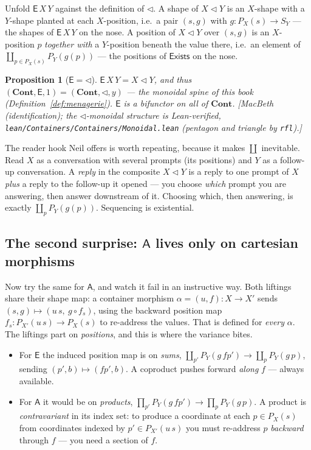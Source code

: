 \documentclass[11pt,a4paper]{book}
\newcommand{\Cont}{\mathbf{Cont}}
\theoremstyle{plain}
\newtheorem{Proposition}[Theorem]{Proposition}
\theoremstyle{definition}
\theoremstyle{remark}
\newcommand{\prov}[1]{\hfill\textsf{\footnotesize[#1]}}
\begin{document}
Unfold $\mathsf E\,X\,Y$ against the definition of $\triangleleft$. A shape of
$X\triangleleft Y$ is an $X$-shape with a $Y$-shape planted at each $X$-position,
i.e.\ a pair $(s,g)$ with $g\colon P_X(s)\to S_Y$ --- the shapes of $\mathsf E\,X\,Y$
on the nose. A position of $X\triangleleft Y$ over $(s,g)$ is an $X$-position $p$
\emph{together with} a $Y$-position beneath the value there, i.e.\ an element of
$\coprod_{p\in P_X(s)}P_Y(g(p))$ --- the positions of $\mathsf{Exists}$ on the nose.

\begin{Proposition}[$\mathsf E=\triangleleft$]\label{prop:E-is-comp}
$\mathsf E\,X\,Y=X\triangleleft Y$, and thus $(\Cont,\mathsf E,1)=(\Cont,\triangleleft,y)$
--- the monoidal spine of this book (Definition~\ref{def:menagerie}). $\mathsf E$ is a
bifunctor on \emph{all} of $\Cont$.
\prov{MacBeth (identification); the $\triangleleft$-monoidal structure is
Lean-verified, \texttt{lean/Containers/Containers/Monoidal.lean} (pentagon and
triangle by \texttt{rfl}).}
\end{Proposition}

The reader hook Neil offers is worth repeating, because it makes $\coprod$
inevitable. Read $X$ as a conversation with several prompts (its positions) and $Y$
as a follow-up conversation. A \emph{reply} in the composite $X\triangleleft Y$ is a
reply to one prompt of $X$ \emph{plus} a reply to the follow-up it opened --- you
choose \emph{which} prompt you are answering, then answer downstream of it. Choosing
which, then answering, is exactly $\coprod_p P_Y(g(p))$. Sequencing is
existential.

\subsection{The second surprise: \texorpdfstring{$\mathsf A$}{A} lives only on
cartesian morphisms}

Now try the same for $\mathsf A$, and watch it fail in an instructive way. Both
liftings share their shape map: a container morphism $\alpha=(u,f)\colon X\to X'$
sends $(s,g)\mapsto(u\,s,\ g\circ f_s)$, using the backward position map
$f_s\colon P_{X'}(u\,s)\to P_X(s)$ to re-address the values. That is defined for
\emph{every} $\alpha$. The liftings part on \emph{positions}, and this is where the
variance bites.

\begin{itemize}[nosep]
  \item For $\mathsf E$ the induced position map is on \emph{sums},
        $\coprod_{p'}P_Y(g\,f p')\to\coprod_p P_Y(g\,p)$, sending $(p',b)\mapsto(f p',b)$.
        A coproduct pushes forward \emph{along} $f$ --- always available.
  \item For $\mathsf A$ it would be on \emph{products},
        $\prod_{p'}P_Y(g\,f p')\to\prod_p P_Y(g\,p)$. A product is
        \emph{contravariant} in its index set: to produce a coordinate at each
        $p\in P_X(s)$ from coordinates indexed by $p'\in P_{X'}(u\,s)$ you must
        re-address $p$ \emph{backward} through $f$ --- you need a section of $f$.
\end{itemize}
\end{document}
